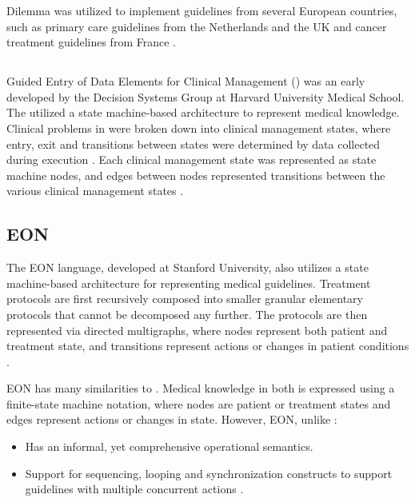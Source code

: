 Dilemma was utilized to implement guidelines from several European
countries, such as primary care guidelines from the Netherlands and the UK and cancer
treatment guidelines from France \cite{HerbertMPB95}.

\subsection{\GEODECM{}}\label{sec:geodecm}

Guided Entry of Data Elements for Clinical Management (\GEODECM{}) was
an early \DSL{} developed by the Decision Systems Group at Harvard University
Medical School. The \GEODECM{} \DSL{} utilized a
state machine-based architecture to represent medical knowledge.
Clinical problems in \GEODECM{} were broken down into clinical management
states, where entry, exit and transitions between states were determined
by data collected during execution \cite{StoufletJAMIA96}. Each
clinical management state was represented as state machine nodes,
and edges between nodes represented transitions between the various clinical
management states \cite{MachadoJAMIA98}.

\subsection{EON}\label{sec:eon}

The EON language, developed at Stanford University, also
utilizes a state machine-based architecture for representing medical guidelines.
Treatment protocols are first recursively composed into smaller granular
elementary protocols that cannot be decomposed any further.
The protocols are then represented via directed multigraphs, where
nodes represent both patient and treatment state, and transitions represent
actions or changes in patient conditions \cite{TuAMIA96}.

EON{} has many similarities to \GEODECM{}. Medical knowledge in both \DSLs{}
is expressed using a finite-state machine notation, where nodes are
patient or treatment states and edges represent actions or changes in state.
However, EON, unlike \GEODECM{}:
\begin{itemize}
  \item Has an informal, yet comprehensive operational semantics.
  \item Support for sequencing, looping and synchronization constructs to support
    guidelines with multiple concurrent actions \cite{TuAMIA96}.
\end{itemize}

